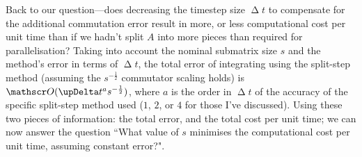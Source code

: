 Back to our question---does decreasing the timestep size $\upDelta t$ to compensate for the additional commutation error result in more, or less computational cost per unit time than if we hadn't split $A$ into more pieces than required for parallelisation? Taking into account the nominal submatrix size $s$ and the method's error in terms of $\upDelta t$, the total error of integrating using the split-step method (assuming the $s^{-\frac12}$ commutator scaling holds) is $\Ord{\upDelta t^a s^{-\frac12}}$, where $a$ is the order in $\upDelta t$ of the accuracy of the specific split-step method used ($1$, $2$, or $4$ for those I've discussed). Using these two pieces of information: the total error, and the total cost per unit time; we can now answer the question ``What value of $s$ minimises the computational cost per unit time, assuming constant error?".

